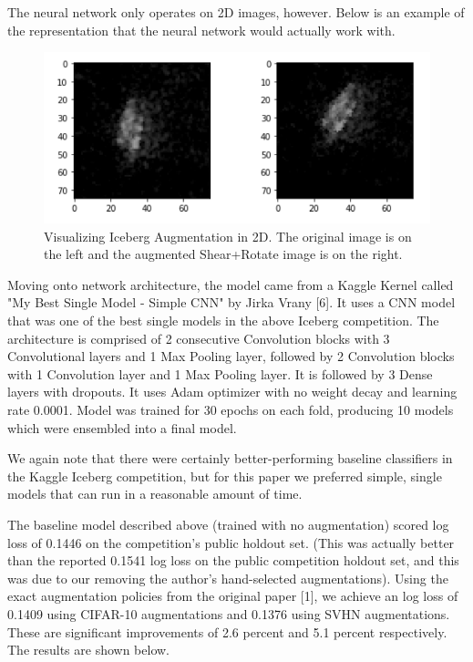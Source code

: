 \documentclass[10pt,twocolumn,letterpaper]{article}
\begin{document}
The neural network only operates on 2D images, however.  Below is an example of the representation that the neural network would actually work with.

\begin{figure}[bhp]
\includegraphics[width=\columnwidth]{iceberg_aug_2d_example.png}
\caption{Visualizing Iceberg Augmentation in 2D.  The original image is on the left and the augmented Shear+Rotate image is on the right.}
\end{figure}

Moving onto network architecture, the model came from a Kaggle Kernel called "My Best Single Model - Simple CNN" by Jirka Vrany [6].  It uses a CNN model that was one of the best single models in the above Iceberg competition. The architecture is comprised of 2 consecutive Convolution blocks with 3 Convolutional layers and 1 Max Pooling layer, followed by 2 Convolution blocks with 1 Convolution layer and 1 Max Pooling layer. It is followed by 3 Dense layers with dropouts. It uses Adam optimizer with no weight decay and learning rate 0.0001. Model was trained for 30 epochs on each fold, producing 10 models which were ensembled into a final model.  

We again note that there were certainly better-performing baseline classifiers in the Kaggle Iceberg competition, but for this paper we preferred simple, single models that can run in a reasonable amount of time.

The baseline model described above (trained with no augmentation) scored log loss of 0.1446 on the competition's public holdout set. (This was actually better than the reported 0.1541 log loss on the public competition holdout set, and this was due to our removing the author's hand-selected augmentations).  Using the exact augmentation policies from the original paper [1], we achieve an log loss of 0.1409 using CIFAR-10 augmentations and 0.1376 using SVHN augmentations.  These are significant improvements of 2.6 percent and 5.1 percent respectively.  The results are shown below.
\end{document}
